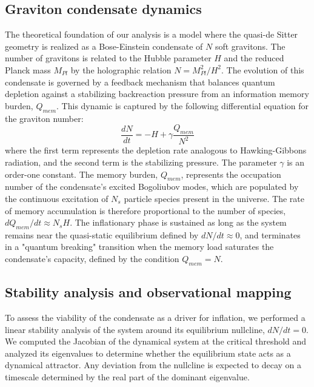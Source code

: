 \documentclass[]{article}
\begin{document}
\subsection{Graviton condensate dynamics}
The theoretical foundation of our analysis is a model where the quasi-de Sitter geometry is realized as a Bose-Einstein condensate of $N$ soft gravitons. The number of gravitons is related to the Hubble parameter $H$ and the reduced Planck mass $M_{Pl}$ by the holographic relation $N = M_{Pl}^2/H^2$. The evolution of this condensate is governed by a feedback mechanism that balances quantum depletion against a stabilizing backreaction pressure from an information memory burden, $Q_{mem}$. This dynamic is captured by the following differential equation for the graviton number:
\begin{equation}
\frac{dN}{dt} = -H + \gamma \frac{Q_{mem}}{N^2}
\label{eq:dNdt}
\end{equation}
where the first term represents the depletion rate analogous to Hawking-Gibbons radiation, and the second term is the stabilizing pressure. The parameter $\gamma$ is an order-one constant. The memory burden, $Q_{mem}$, represents the occupation number of the condensate's excited Bogoliubov modes, which are populated by the continuous excitation of $N_s$ particle species present in the universe. The rate of memory accumulation is therefore proportional to the number of species, $dQ_{mem}/dt \approx N_s H$. The inflationary phase is sustained as long as the system remains near the quasi-static equilibrium defined by $dN/dt \approx 0$, and terminates in a "quantum breaking" transition when the memory load saturates the condensate's capacity, defined by the condition $Q_{mem} = N$.

\subsection{Stability analysis and observational mapping}
To assess the viability of the condensate as a driver for inflation, we performed a linear stability analysis of the system around its equilibrium nullcline, $dN/dt = 0$. We computed the Jacobian of the dynamical system at the critical threshold and analyzed its eigenvalues to determine whether the equilibrium state acts as a dynamical attractor. Any deviation from the nullcline is expected to decay on a timescale determined by the real part of the dominant eigenvalue.
\end{document}
